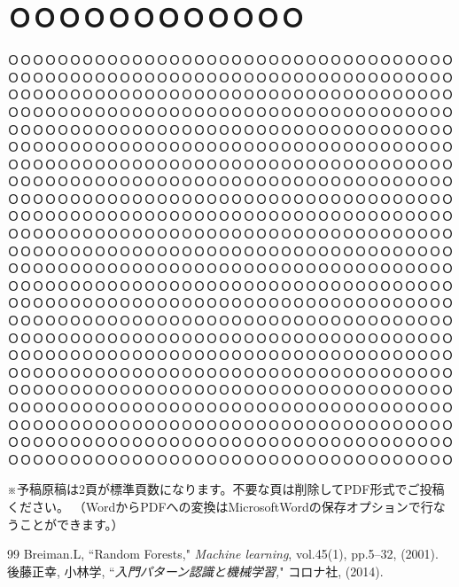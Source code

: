 \documentclass[10pt,twocolumn]{jarticle}
\begin{document}
\section{ＯＯＯＯＯＯＯＯＯＯＯＯ}
ＯＯＯＯＯＯＯＯＯＯＯＯＯＯＯＯＯＯＯＯＯＯＯＯＯＯＯＯＯＯＯＯＯＯＯＯＯＯＯＯＯＯＯＯＯＯＯＯＯＯＯＯＯＯＯＯＯＯＯＯＯＯＯＯＯＯＯＯＯＯＯＯＯＯＯＯＯＯＯＯＯＯＯＯＯＯＯＯＯＯＯＯＯＯＯＯＯＯＯＯＯＯＯＯＯＯＯＯＯＯＯＯＯＯＯＯＯＯＯＯＯＯＯＯＯＯＯＯＯＯＯＯＯＯＯＯＯＯＯＯＯＯＯＯＯＯＯＯＯＯＯＯＯＯＯＯＯＯＯＯＯＯＯＯＯＯＯＯＯＯＯＯＯＯＯＯＯＯＯＯＯＯＯＯＯＯＯＯＯＯＯＯＯＯＯＯＯＯＯＯＯＯＯＯＯＯＯＯＯＯＯＯＯＯＯＯＯＯＯＯＯＯＯＯＯＯＯＯＯＯＯＯＯＯＯＯＯＯＯＯＯＯＯＯＯＯＯＯＯＯＯＯＯＯＯＯＯＯＯＯＯＯＯＯＯＯＯＯＯＯＯＯＯＯＯＯＯＯＯＯＯＯＯＯＯＯＯＯＯＯＯＯＯＯＯＯＯＯＯＯＯＯＯＯＯＯＯＯＯＯＯＯＯＯＯＯＯＯＯＯＯＯＯＯＯＯＯＯＯＯＯＯＯＯＯＯＯＯＯＯＯＯＯＯＯＯＯＯＯＯＯＯＯＯＯＯＯＯＯＯＯＯＯＯＯＯＯＯＯＯＯＯＯＯＯＯＯＯＯＯＯＯＯＯＯＯＯＯＯＯＯＯＯＯＯＯＯＯＯＯＯＯＯＯＯＯＯＯＯＯＯＯＯＯＯＯＯＯＯＯＯＯＯＯＯＯＯＯＯＯＯＯＯＯＯＯＯＯＯＯＯＯＯＯＯＯＯＯＯＯＯＯＯＯＯＯＯＯＯＯＯＯＯＯＯＯＯＯＯＯＯＯＯＯＯＯＯＯＯＯＯＯＯＯＯＯＯＯＯＯＯＯＯＯＯＯＯＯＯＯＯＯＯＯＯＯＯＯＯＯＯＯＯＯＯＯＯＯＯＯＯＯＯＯＯＯＯＯＯＯＯＯＯＯＯＯＯＯＯＯＯＯＯＯＯＯＯＯＯＯＯＯＯＯＯＯＯＯＯＯＯＯＯＯＯＯＯＯＯＯＯＯＯＯＯＯＯＯＯＯＯＯＯＯＯＯＯＯＯＯＯＯＯＯＯＯＯＯＯＯＯＯＯＯＯＯＯＯＯＯＯＯＯＯＯＯＯＯＯＯＯＯＯＯＯＯＯＯＯＯＯＯＯＯＯＯＯＯＯＯＯＯＯＯＯＯＯＯＯＯＯＯＯＯＯＯＯＯＯＯＯＯＯＯＯＯＯＯＯＯＯＯＯＯＯＯＯＯＯＯＯＯＯＯＯＯＯＯＯＯＯＯＯＯＯＯＯＯＯＯＯＯＯＯＯＯＯＯＯＯＯＯＯＯＯＯＯＯＯＯＯＯＯＯＯＯＯＯＯＯＯＯＯＯＯＯＯＯＯＯＯＯＯＯＯＯＯＯＯＯＯＯＯＯＯＯＯＯＯＯＯＯＯＯＯＯＯＯＯＯＯＯＯＯＯＯＯＯＯＯＯＯＯＯＯＯＯＯＯＯＯＯＯＯＯＯＯＯＯＯＯＯＯＯＯＯＯＯＯＯＯＯＯＯＯＯＯＯＯＯＯＯＯＯＯＯＯＯＯＯＯＯＯＯＯＯＯＯＯＯＯＯＯＯＯＯＯＯＯＯＯＯＯＯＯＯＯＯＯＯＯＯＯＯ

※予稿原稿は2頁が標準頁数になります。不要な頁は削除してPDF形式でご投稿ください。
（WordからPDFへの変換はMicrosoftWordの保存オプションで行なうことができます。）


\begin{thebibliography}{99} 
Breiman.L, ``Random Forests," {\it Machine learning}, vol.45(1), pp.5--32, (2001).
後藤正幸, 小林学, ``{\it 入門パターン認識と機械学習,}" コロナ社, (2014).


\end{thebibliography}
\end{document}
